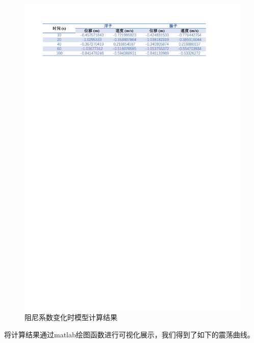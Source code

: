 \documentclass[12pt,utf8]{article}
\begin{document}
\begin{figure}[h]
	\centering
	\includegraphics[width=0.7\linewidth]{figures/result1-2.pdf}
	\caption[]{阻尼系数变化时模型计算结果}
	\label{fig:result1-2}
\end{figure}

将计算结果通过matlab绘图函数进行可视化展示，我们得到了如下的震荡曲线。
\end{document}
